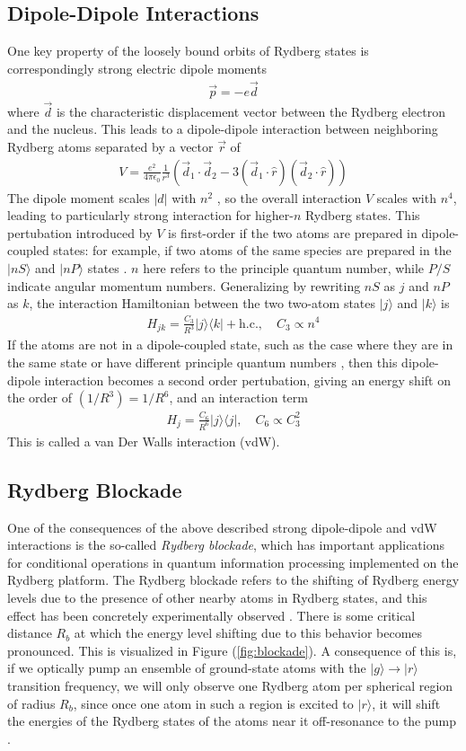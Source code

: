 \documentclass[aps,twocolumn,preprintnumbers]{revtex4}
\newcommand{\eq}{\begin{equation}\begin{aligned}}
\newcommand{\qe}{\end{aligned}\end{equation}}
\newcommand{\bra}[1]{\langle #1|}
\newcommand{\ket}[1]{|#1\rangle}
\begin{document}
\subsection{Dipole-Dipole Interactions}
One key property of the loosely bound orbits of Rydberg states is correspondingly strong electric dipole moments
\eq
  \vec{p}=-e\vec{d}
\qe
where $\vec{d}$ is the characteristic displacement vector between the Rydberg electron and the nucleus. This leads to a dipole-dipole interaction between neighboring Rydberg atoms separated by a vector $\vec{r}$ of 
\eq
  V=\frac{e^2}{4\pi\epsilon_0}\frac{1}{r^3}(\vec{d}_1\cdot\vec{d}_2-3(\vec{d}_1\cdot\hat{r})(\vec{d}_2\cdot\hat{r}))
\qe
The dipole moment scales $|d|$ with $n^2$ \cite{concise}, so the overall interaction $V$ scales with $n^4$, leading to particularly strong interaction for higher-$n$ Rydberg states. This pertubation introduced by $V$ is first-order if the two atoms are prepared in dipole-coupled states: for example, if two atoms of the same species are prepared in the $\ket{nS}$ and $\ket{nP}$ states \cite{gates}. $n$ here refers to the principle quantum number, while $P/S$ indicate angular momentum numbers. Generalizing by rewriting $nS$ as $j$ and $nP$ as $k$, the interaction Hamiltonian between the two two-atom states $\ket{j}$ and $\ket{k}$ is
\eq
  H_{jk}=\frac{C_3}{R^3}\ket{j}\bra{k}+\text{h.c.},\quad C_3\propto n^4
\qe
If the atoms are not in a dipole-coupled state, such as the case where they are in the same state or have different principle quantum numbers \cite{gates}, then this dipole-dipole interaction becomes a second order pertubation, giving an energy shift on the order of $(1/R^3)=1/R^6$, and an interaction term
\eq
  H_{j}= \frac{C_6}{R^6}\ket{j}\bra{j}, \quad C_6\propto C_3^2
\qe
This is called a van Der Walls interaction (vdW).\\

\subsection{Rydberg Blockade}
One of the consequences of the above described strong dipole-dipole and vdW interactions is the so-called \textit{Rydberg blockade}, which has important applications for conditional operations in quantum information processing implemented on the Rydberg platform. The Rydberg blockade refers to the shifting of Rydberg energy levels due to the presence of other nearby atoms in Rydberg states, and this effect has been concretely experimentally observed \cite{block}. There is some critical distance $R_b$ at which the energy level shifting due to this behavior becomes pronounced.
This is visualized in Figure (\ref{fig:blockade}). A consequence of this is, if we optically pump an ensemble of ground-state atoms with the $\ket{g}\to\ket{r}$ transition frequency, we will only observe one Rydberg atom per spherical region of radius $R_b$, since once one atom in such a region is excited to $\ket{r}$, it will shift the energies of the Rydberg states of the atoms near it off-resonance to the pump \cite{concise}.
\end{document}
